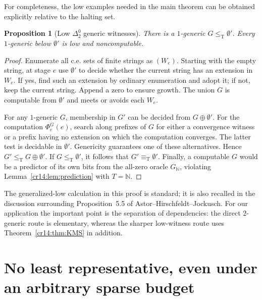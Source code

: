 \documentclass[11pt,a4paper]{article}
\newcommand{\N}{\mathbb N}
\newcommand{\leT}{\leq_{\mathrm T}}
\newcommand{\eqT}{\equiv_{\mathrm T}}
\newcommand{\jumpzero}{\emptyset'}
\newtheorem{proposition}[theorem]{Proposition}
\theoremstyle{definition}
\theoremstyle{remark}
\begin{document}
For completeness, the low examples needed in the main theorem can be
obtained explicitly relative to the halting set.

\begin{proposition}[Low $\Delta^0_2$ generic witnesses]\label{cr14:prop:low}
There is a $1$-generic $G\leT\jumpzero$. Every $1$-generic below
$\jumpzero$ is low and noncomputable.
\end{proposition}
\begin{proof}
Enumerate all c.e. sets of finite strings as $(W_e)$. Starting with the
empty string, at stage $e$ use $\jumpzero$ to decide whether the current
string has an extension in $W_e$. If yes, find such an extension by
ordinary enumeration and adopt it; if not, keep the current string.
Append a zero to ensure growth. The union $G$ is computable from
$\jumpzero$ and meets or avoids each $W_e$.

For any $1$-generic $G$, membership in $G'$ can be decided from
$G\oplus\jumpzero$. For the computation $\Phi_e^G(e)$, search along
prefixes of $G$ for either a convergence witness or a prefix having no
extension on which the computation converges. The latter test is decidable
in $\jumpzero$. Genericity guarantees one of these alternatives.
Hence $G'\leT G\oplus\jumpzero$. If $G\leT\jumpzero$, it follows that
$G'\eqT\jumpzero$. Finally, a computable $G$ would be a predictor of its
own bits from the all-zero oracle $G_\N$, violating
Lemma~\ref{cr14:lem:prediction} with $T=\N$.
\end{proof}

The generalized-low calculation in this proof is standard; it is also
recalled in the discussion surrounding Proposition~5.5 of
Astor--Hirschfeldt--Jockusch.\cite{AHJ}
For our application the important point is the separation of dependencies:
the direct $2$-generic route is elementary, whereas the sharper low-witness
route uses Theorem~\ref{cr14:thm:KMS} in addition.

\section{No least representative, even under an arbitrary sparse budget}
\label{cr14:sec:mainproof}
\end{document}
